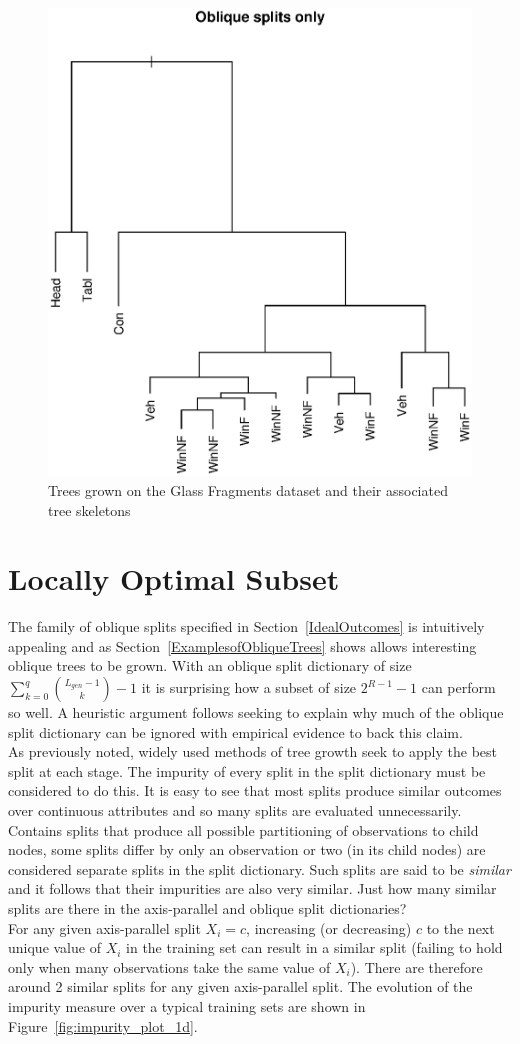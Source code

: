 \begin{figure}
\includegraphics[width=.32\textwidth]{oblique_splits_fgl_only_tree_skeleton.ps}
\caption{Trees grown on the Glass Fragments dataset and their associated tree skeletons}
\label{fig:oblique_splits_fgl_tree}
\end{figure}

\section{Locally Optimal Subset}
\label{LocallyOptimalSubset}
The family of oblique splits specified in Section~\ref{IdealOutcomes} is intuitively appealing and as Section~\ref{ExamplesofObliqueTrees} shows allows interesting oblique trees to be grown. With an oblique split dictionary of size $\sum_{k=0}^{q} {L_{gen}-1\choose k}-1$ it is surprising how a subset of size $2^{R-1}-1$ can perform so well. A heuristic argument follows seeking to explain why much of the oblique split dictionary can be ignored with empirical evidence to back this claim. \\

As previously noted, widely used methods of tree growth seek to apply the best split at each stage. The impurity of every split in the split dictionary must be considered to do this. It is easy to see that most splits produce similar outcomes over continuous attributes and so many splits are evaluated unnecessarily. Contains splits that produce all possible partitioning of observations to child nodes, some splits differ by only an observation or two (in its child nodes) are considered separate splits in the split dictionary. Such splits are said to be \emph{similar} and it follows that their impurities are also very similar. Just how many similar splits are there in the axis-parallel and oblique split dictionaries?\\

For any given axis-parallel split $X_i=c$, increasing (or decreasing) $c$ to the next unique value of $X_i$ in the training set can result in a similar split (failing to hold only when many observations take the same value of $X_i$). There are therefore around 2 similar splits for any given axis-parallel split. The evolution of the impurity measure over a typical training sets are shown in Figure~\ref{fig:impurity_plot_1d}.\\


